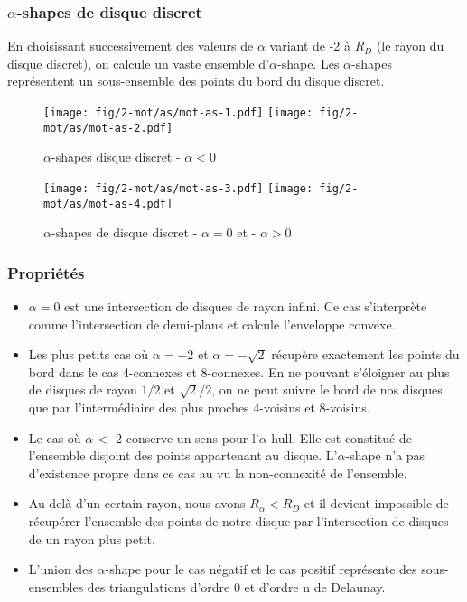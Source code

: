\subsubsection{$\alpha$-shapes de disque discret}

En choisissant successivement des valeurs de $\alpha$ variant de -2 à $R_D$ (le rayon du disque discret), on calcule un vaste ensemble d'$\alpha$-shape. Les $\alpha$-shapes représentent un sous-ensemble des points du bord du disque discret.

\begin{figure}[H]
  \centering
  \texttt{[image: fig/2-mot/as/mot-as-1.pdf]}
  \texttt{[image: fig/2-mot/as/mot-as-2.pdf]}
  \caption{$\alpha$-shapes disque discret - $\alpha < 0$}
\end{figure}

\begin{figure}[H]
  \centering
  \texttt{[image: fig/2-mot/as/mot-as-3.pdf]}
  \texttt{[image: fig/2-mot/as/mot-as-4.pdf]}
  \caption{$\alpha$-shapes de disque discret - $\alpha = 0$ et - $\alpha > 0$}
\end{figure}



\subsubsection{Propriétés}


\begin{itemize}
  \item $\alpha = 0$ est une intersection de disques de rayon infini. Ce cas s'interprète comme l'intersection de demi-plans et calcule l'enveloppe convexe.
  \item Les plus petits cas où $\alpha = -2$ et $\alpha = -\sqrt{2}$ récupère exactement les points du bord dans le cas 4-connexes et 8-connexes. En ne pouvant s'éloigner au plus de disques de rayon $1/2$ et $\sqrt{2}/2$, on ne peut suivre le bord de nos disques que par l'intermédiaire des plus proches 4-voisins et 8-voisins.
  \item Le cas où $\alpha$ < -2 conserve un sens pour l'$\alpha$-hull. Elle est constitué de l'ensemble disjoint des points appartenant au disque. L'$\alpha$-shape n'a pas d'existence propre dans ce cas au vu la non-connexité de l'ensemble.
  \item Au-delà d'un certain rayon, nous avons $R_{\alpha} < R_D$ et il devient impossible de récupérer l'ensemble des points de notre disque par l'intersection de disques de un rayon plus petit.
  \item L'union des $\alpha$-shape \cite{EdeKirSei83} pour le cas négatif et le cas positif représente des sous-ensembles des triangulations d'ordre 0 et d'ordre n de Delaunay.   
\end{itemize}
 
